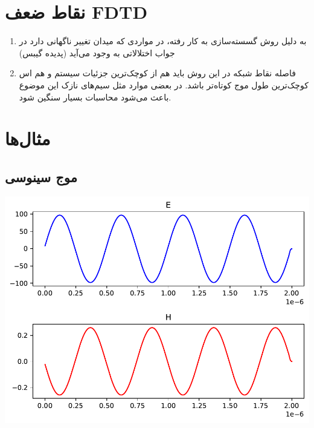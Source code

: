 \documentclass[12pt,a4paper]{article}
\begin{document}
	\section{نقاط ضعف FDTD}
	\begin{enumerate}
		\item به دلیل روش گسسته‌سازی به کار رفته، در مواردی که میدان تغییر ناگهانی دارد در جواب اختلالاتی به وجود می‌آید (پدیده گیبس)
		\item فاصله نقاط شبکه در این روش باید هم از کوچک‌ترین جزئیات سیستم و هم اس کوچک‌ترین طول موج کوتاه‌تر باشد.
		در بعضی موارد مثل سیم‌های نازک این موضوع باعث می‌شود محاسبات بسیار سنگین شود.
	\end{enumerate}
	\section{مثال‌ها}
	\subsection{موج سینوسی}
	\begin{center}
		\includegraphics{sin}
	\end{center}
\end{document}
